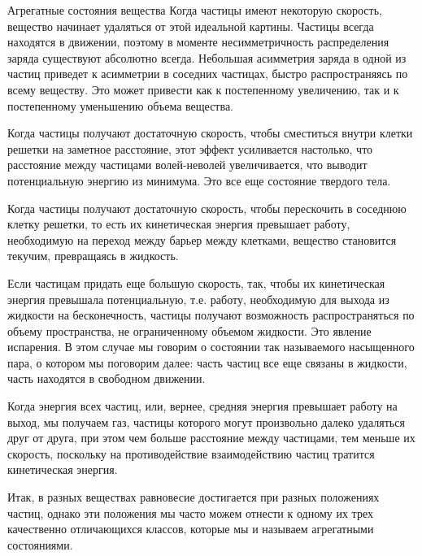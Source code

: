 \documentclass{article}
\begin{document}
\begin{section}{Агрегатные состояния вещества}
		Когда частицы имеют некоторую скорость, вещество начинает удаляться от этой идеальной картины. Частицы всегда находятся в движении, поэтому в моменте несимметричность распределения заряда существуют абсолютно всегда. Небольшая асимметрия заряда в одной из частиц приведет к асимметрии в соседних частицах, быстро распространяясь по всему веществу. Это может привести как к постепенному увеличению, так и к постепенному уменьшению объема вещества.

		Когда частицы получают достаточную скорость, чтобы сместиться внутри клетки решетки на заметное расстояние, этот эффект усиливается настолько, что расстояние между частицами волей-неволей увеличивается, что выводит потенциальную энергию из минимума. Это все еще состояние твердого тела.

		Когда частицы получают достаточную скорость, чтобы перескочить в соседнюю клетку решетки, то есть их кинетическая энергия превышает работу, необходимую на переход между барьер между клетками, вещество становится текучим, превращаясь в жидкость.

		Если частицам придать еще большую скорость, так, чтобы их кинетическая энергия превышала потенциальную, т.е. работу, необходимую для выхода из жидкости на бесконечность, частицы получают возможность распространяться по объему пространства, не ограниченному объемом жидкости. Это явление испарения. В этом случае мы говорим о состоянии так называемого насыщенного пара, о котором мы поговорим далее: часть частиц все еще связаны в жидкости, часть находятся в свободном движении.

		Когда энергия всех частиц, или, вернее, средняя энергия превышает работу на выход, мы получаем газ, частицы которого могут произвольно далеко удаляться друг от друга, при этом чем больше расстояние между частицами, тем меньше их скорость, поскольку на противодействие взаимодействию частиц тратится кинетическая энергия.

		Итак, в разных веществах равновесие достигается при разных положениях частиц, однако эти положения мы часто можем отнести к одному их трех качественно отличающихся классов, которые мы и называем агрегатными состояниями.
	\end{section}
\end{document}
